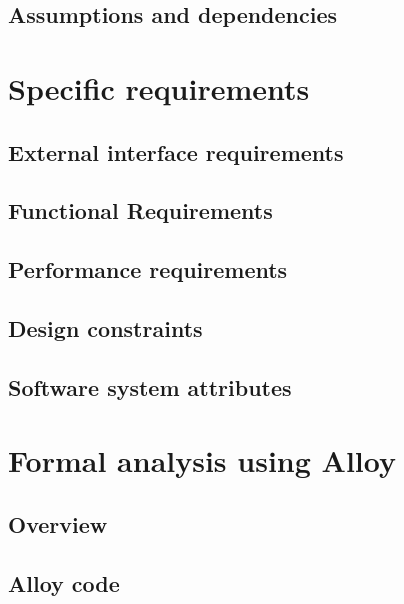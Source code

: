   \section{Assumptions and dependencies}
  
  
  \chapter{Specific requirements}
  \section{External interface requirements}
  
  \section{Functional Requirements}
  
  \section{Performance requirements}
  
  \section{Design constraints}
  
  \section{Software system attributes}
  

  \chapter{Formal analysis using Alloy}
  \section{Overview}
  
  \section{Alloy code}
  
